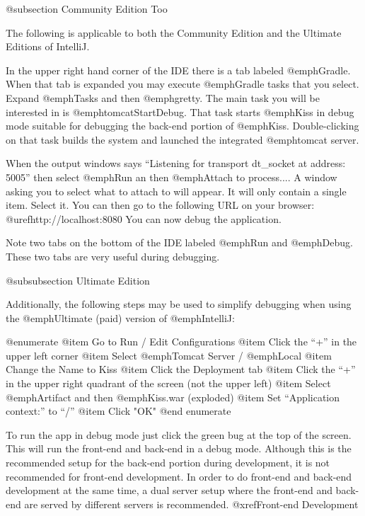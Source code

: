 @subsection Community Edition Too

The following is applicable to both the Community Edition and the Ultimate Editions of IntelliJ.

In the upper right hand corner of the IDE there is a tab labeled @emph{Gradle}.  When that tab is expanded you may execute @emph{Gradle} tasks that you select.
Expand @emph{Tasks} and then @emph{gretty}.  The main task you will be interested in is @emph{tomcatStartDebug}.  That task starts @emph{Kiss}
in debug mode suitable for debugging the back-end portion of @emph{Kiss}.  Double-clicking on that task builds the system and launched the integrated @emph{tomcat}
server.  

When the output windows says ``Listening for transport dt_socket at address: 5005'' then select @emph{Run} an then @emph{Attach to process...}.
A window asking you to select what to attach to will appear.  It will only contain a single item.  Select it. You can then go to the following URL
on your browser:  @uref{http://localhost:8080}  You can now debug the application.

Note two tabs on the bottom of the IDE labeled @emph{Run} and @emph{Debug}.  These two tabs are very useful during debugging.



@subsubsection Ultimate Edition

Additionally, the following steps may be used to simplify debugging when using the @emph{Ultimate} (paid) version of @emph{IntelliJ}:



@enumerate
@item
Go to Run / Edit Configurations
@item
Click the ``+'' in the upper left corner
@item
Select @emph{Tomcat Server} / @emph{Local}
@item
Change the Name to Kiss
@item
Click the Deployment tab
@item
Click the ``+'' in the upper right quadrant of the screen (not the upper left)
@item
Select @emph{Artifact} and then @emph{Kiss.war} (exploded)
@item
Set ``Application context:'' to ``/''
@item
Click "OK"
@end enumerate

To run the app in debug mode just click the green bug at the top of the screen.  This will run the front-end and back-end 
in a debug mode.  Although this is the recommended setup for the back-end portion during development, it is not recommended
for front-end development.  In order to do front-end and back-end development at the same time, a dual server setup where
the front-end and back-end are served by different servers is recommended.    @xref{Front-end Development}


